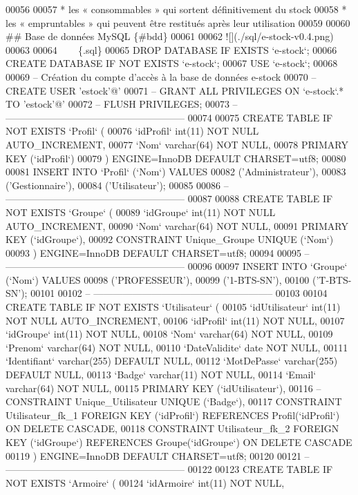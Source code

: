 \begin{DoxyCode}
00056 
00057 * les « consommables » qui sortent définitivement du stock
00058 * les « empruntables » qui peuvent être restitués après leur utilisation
00059 
00060 ## Base de données MySQL \{#bdd\}
00061 
00062 ![](./sql/e-stock-v0.4.png)
00063 
00064 ~~~ \{.sql\}
00065 DROP DATABASE IF EXISTS `e-stock`;
00066 CREATE DATABASE IF NOT EXISTS `e-stock`;
00067 USE `e-stock`;
00068 
00069 -- Création du compte d'accès à la base de données e-stock
00070 -- CREATE USER 'estock'@'%
00071 -- GRANT ALL PRIVILEGES ON `e-stock`.* TO 'estock'@'%
00072 -- FLUSH PRIVILEGES;
00073 -- --------------------------------------------------------
00074 
00075 CREATE TABLE IF NOT EXISTS `Profil` (
00076   `idProfil` int(11) NOT NULL AUTO\_INCREMENT,
00077   `Nom` varchar(64) NOT NULL,
00078   PRIMARY KEY (`idProfil`)
00079 ) ENGINE=InnoDB DEFAULT CHARSET=utf8;
00080 
00081 INSERT INTO `Profil` (`Nom`) VALUES
00082 ('Administrateur'),
00083 ('Gestionnaire'),
00084 ('Utilisateur');
00085 
00086 -- --------------------------------------------------------
00087 
00088 CREATE TABLE IF NOT EXISTS `Groupe` (
00089   `idGroupe` int(11) NOT NULL AUTO\_INCREMENT,
00090   `Nom` varchar(64) NOT NULL,
00091   PRIMARY KEY (`idGroupe`),
00092   CONSTRAINT Unique\_Groupe UNIQUE (`Nom`)
00093 ) ENGINE=InnoDB DEFAULT CHARSET=utf8;
00094 
00095 -- --------------------------------------------------------
00096 
00097 INSERT INTO `Groupe` (`Nom`) VALUES
00098 ('PROFESSEUR'),
00099 ('1-BTS-SN'),
00100 ('T-BTS-SN');
00101 
00102 -- --------------------------------------------------------
00103 
00104 CREATE TABLE IF NOT EXISTS `Utilisateur` (
00105   `idUtilisateur` int(11) NOT NULL AUTO\_INCREMENT,
00106   `idProfil` int(11) NOT NULL,
00107   `idGroupe` int(11) NOT NULL,
00108   `Nom` varchar(64) NOT NULL,
00109   `Prenom` varchar(64) NOT NULL,
00110   `DateValidite` date NOT NULL,
00111   `Identifiant` varchar(255) DEFAULT NULL,
00112   `MotDePasse` varchar(255) DEFAULT NULL,
00113   `Badge` varchar(11) NOT NULL,
00114   `Email` varchar(64) NOT NULL,  
00115   PRIMARY KEY (`idUtilisateur`),
00116 --  CONSTRAINT Unique\_Utilisateur UNIQUE (`Badge`),
00117   CONSTRAINT Utilisateur\_fk\_1 FOREIGN KEY (`idProfil`) REFERENCES Profil(`idProfil`) ON DELETE
       CASCADE,
00118   CONSTRAINT Utilisateur\_fk\_2 FOREIGN KEY (`idGroupe`) REFERENCES Groupe(`idGroupe`) ON DELETE CASCADE
00119 ) ENGINE=InnoDB DEFAULT CHARSET=utf8;
00120 
00121 -- --------------------------------------------------------
00122 
00123 CREATE TABLE IF NOT EXISTS `Armoire` (
00124   `idArmoire` int(11) NOT NULL,

\end{DoxyCode}
